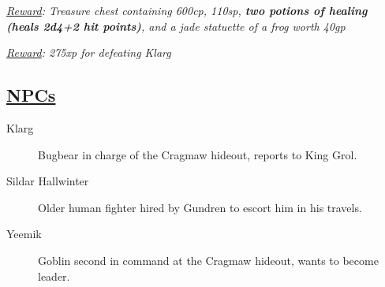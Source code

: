 \emph{\underline{Reward}: Treasure chest containing 600cp, 110sp, \textbf{two potions of healing (heals 2d4+2 hit points)}, and a jade statuette of a frog worth 40gp}

\emph{\underline{Reward}: 275xp for defeating Klarg} 


\subsection*{\underline{NPCs}}
\begin{description}
	\item[Klarg] Bugbear in charge of the Cragmaw hideout, reports to King Grol.
	\item[Sildar Hallwinter] Older human fighter hired by Gundren to escort him in his travels.
	\item[Yeemik] Goblin second in command at the Cragmaw hideout, wants to become leader.
\end{description}